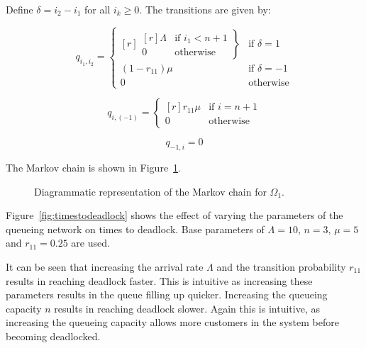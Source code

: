 \documentclass{article}
\begin{document}
Define $\delta = i_2 - i_1$ for all $i_k \geq 0$. The transitions are given by:

\begin{equation}
  q_{i_1, i_2} = \left\{
  \begin{matrix*}[ r ]
    \left. \begin{matrix*}[ r ]
      \Lambda & \text{if } i_1 < n + 1 \\
      0 & \text{otherwise}
    \end{matrix*} \right\} & \text{if } \delta = 1 \\
    (1 - r_{11})\mu & \text{if } \delta = -1 \\
    0 & \text{otherwise}
  \end{matrix*} \right.
\end{equation}

\begin{equation}
  q_{i, (-1)} = \left\{
  \begin{matrix*}[ r ]
    r_{11}\mu & \text{if } i = n + 1 \\
    0 & \text{otherwise}
  \end{matrix*}
  \right.
\end{equation}

\begin{equation}
  q_{-1, i} = 0
\end{equation}

The Markov chain is shown in Figure~\ref{fig:1nodeMC}.

\begin{figure}[!htbp]
  \begin{center}
    
  \end{center}
  \caption{Diagrammatic representation of the Markov chain for $\Omega_1$.}
  \label{fig:1nodeMC}
\end{figure}

Figure~\ref{fig:timestodeadlock} shows the effect of varying the parameters of the queueing network on times to deadlock.
Base parameters of $\Lambda = 10$, $n = 3$, $\mu = 5$ and $r_{11} = 0.25$ are used.

It can be seen that increasing the arrival rate $\Lambda$ and the transition probability $r_{11}$ results in reaching deadlock faster.
This is intuitive as increasing these parameters results in the queue filling up quicker.
Increasing the queueing capacity $n$ results in reaching deadlock slower.
Again this is intuitive, as increasing the queueing capacity allows more customers in the system before becoming deadlocked.
\end{document}
